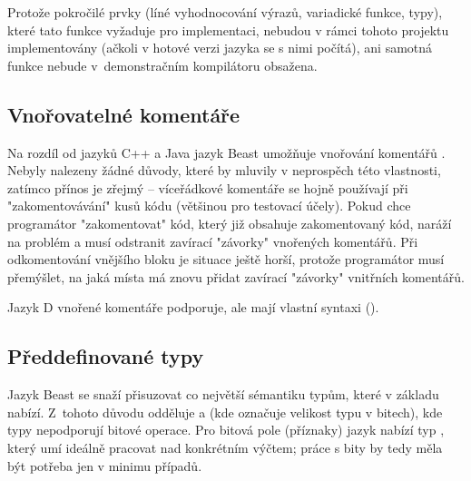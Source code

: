 Protože pokročilé prvky (líné vyhodnocování výrazů, variadické funkce,  typy), které tato funkce vyžaduje pro implementaci, nebudou v rámci tohoto projektu implementovány (ačkoli v hotové verzi jazyka se s nimi počítá), ani samotná funkce  nebude v~demonstračním kompilátoru obsažena.


\subsection{Vnořovatelné komentáře}
Na rozdíl od jazyků C++ a Java jazyk Beast umožňuje vnořování komentářů . Nebyly nalezeny žádné důvody, které by mluvily v neprospěch této vlastnosti, zatímco přínos je zřejmý -- víceřádkové komentáře se hojně používají při "zakomentovávání" kusů kódu (většinou pro testovací účely). Pokud chce programátor "zakomentovat" kód, který již obsahuje zakomentovaný kód, naráží na problém a musí odstranit zavírací "závorky" \inlineCode{*/} vnořených komentářů. Při odkomentování vnějšího bloku je situace ještě horší, protože programátor musí přemýšlet, na jaká místa má znovu přidat zavírací "závorky" vnitřních komentářů.

Jazyk D vnořené komentáře podporuje, ale mají vlastní syntaxi ().


\subsection{Předdefinované typy}
Jazyk Beast se snaží přisuzovat co největší sémantiku typům, které v základu nabízí. Z~tohoto důvodu odděluje  a  (kde  označuje velikost typu v bitech), kde typy  nepodporují bitové operace. Pro bitová pole (příznaky) jazyk nabízí typ , který umí ideálně pracovat nad konkrétním výčtem; práce s bity by tedy měla být potřeba jen v minimu případů.

